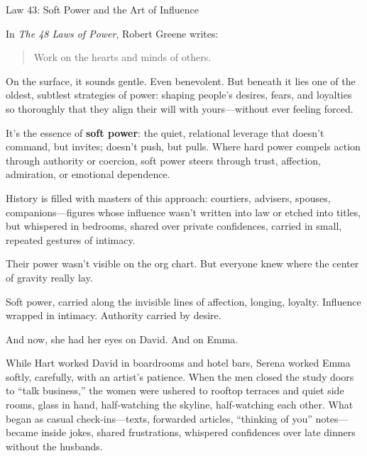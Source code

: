 \begin{HistoricalSidebar}{Law 43: Soft Power and the Art of Influence}

  In \textit{The 48 Laws of Power}, Robert Greene writes:
  
  \begin{quote}
  Work on the hearts and minds of others.
  \end{quote}
  
  On the surface, it sounds gentle. Even benevolent. But beneath it lies one of the oldest, subtlest strategies of power: shaping people’s desires, fears, and loyalties so thoroughly that they align their will with yours—without ever feeling forced.

  \medskip

  It’s the essence of \textbf{soft power}: the quiet, relational leverage that doesn’t command, but invites; doesn’t push, but pulls. Where hard power compels action through authority or coercion, soft power steers through trust, affection, admiration, or emotional dependence.
  
  \medskip
  
  History is filled with masters of this approach: courtiers, advisers, spouses, companions—figures whose influence wasn’t written into law or etched into titles, but whispered in bedrooms, shared over private confidences, carried in small, repeated gestures of intimacy.

  \medskip
  
  Their power wasn’t visible on the org chart.  But everyone knew where the center of gravity really lay.
  
\end{HistoricalSidebar}


\medskip

Soft power, carried along the invisible lines of affection, longing, loyalty.  
Influence wrapped in intimacy.  
Authority carried by desire.

And now,  
she had her eyes on David.  
And on Emma.


While Hart worked David in boardrooms and hotel bars, Serena worked Emma softly, carefully, with an artist’s patience.  
When the men closed the study doors to “talk business,” the women were ushered to rooftop terraces and quiet side rooms, glass in hand, half-watching the skyline, half-watching each other.  
What began as casual check-ins—texts, forwarded articles, “thinking of you” notes—became inside jokes, shared frustrations, whispered confidences over late dinners without the husbands.  

